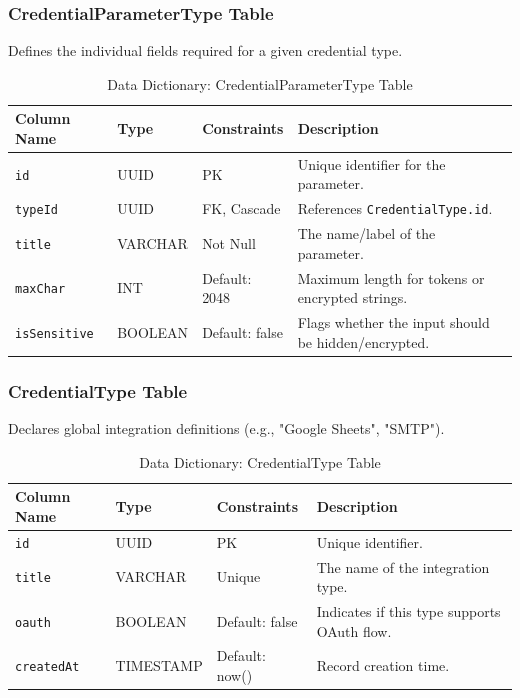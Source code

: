 \subsubsection{CredentialParameterType Table}
Defines the individual fields required for a given credential type.
\begin{table}[H]
\centering
\renewcommand{\arraystretch}{1.3}
\begin{tabularx}{\textwidth}{|l|l|l|X|}
\hline
\textbf{Column Name} & \textbf{Type} & \textbf{Constraints} & \textbf{Description} \\
\hline
\texttt{id} & UUID & PK & Unique identifier for the parameter. \\
\hline
\texttt{typeId} & UUID & FK, Cascade & References \texttt{CredentialType.id}. \\
\hline
\texttt{title} & VARCHAR & Not Null & The name/label of the parameter. \\
\hline
\texttt{maxChar} & INT & Default: 2048 & Maximum length for tokens or encrypted strings. \\
\hline
\texttt{isSensitive} & BOOLEAN & Default: false & Flags whether the input should be hidden/encrypted. \\
\hline
\end{tabularx}
\caption{Data Dictionary: CredentialParameterType Table}
\label{tab:dict-credparamtype}
\end{table}

\subsubsection{CredentialType Table}
Declares global integration definitions (e.g., "Google Sheets", "SMTP").
\begin{table}[H]
\centering
\renewcommand{\arraystretch}{1.3}
\begin{tabularx}{\textwidth}{|l|l|l|X|}
\hline
\textbf{Column Name} & \textbf{Type} & \textbf{Constraints} & \textbf{Description} \\
\hline
\texttt{id} & UUID & PK & Unique identifier. \\
\hline
\texttt{title} & VARCHAR & Unique & The name of the integration type. \\
\hline
\texttt{oauth} & BOOLEAN & Default: false & Indicates if this type supports OAuth flow. \\
\hline
\texttt{createdAt} & TIMESTAMP & Default: now() & Record creation time. \\
\hline
\end{tabularx}
\caption{Data Dictionary: CredentialType Table}
\label{tab:dict-credtype}
\end{table}

